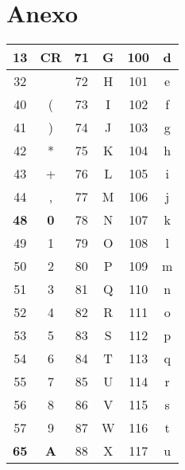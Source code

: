 \documentclass[10pt,twocolumn]{article}
\begin{document}
\section{Anexo}
\label{sec:anexo}

\begin{table}[h!]
  \centering
  \begin{tabular}{|cc|cc|cc|}
  \hline
  13          & CR         & 71         & G            & 100 & d               \\ \hline  
  32          &            & 72         & H            & 101 & e               \\ \hline
  40          & (          & 73         & I            & 102 & f               \\ \hline
  41          & )          & 74         & J            & 103 & g               \\ \hline
  42          & *          & 75         & K            & 104 & h               \\ \hline
  43          & +          & 76         & L            & 105 & i               \\ \hline
  44          & ,          & 77         & M            & 106 & j               \\ \hline
  \textbf{48} & \textbf{0} & 78         & N            & 107 & k               \\ \hline
  49          & 1          & 79         & O            & 108 & l               \\ \hline
  50          & 2          & 80         & P            & 109 & m               \\ \hline
  51          & 3          & 81         & Q            & 110 & n               \\ \hline
  52          & 4          & 82         & R            & 111 & o               \\ \hline
  53          & 5          & 83         & S            & 112 & p               \\ \hline
  54          & 6          & 84         & T            & 113 & q               \\ \hline
  55          & 7          & 85         & U            & 114 & r               \\ \hline
  56          & 8          & 86         & V            & 115 & s               \\ \hline
  57          & 9          & 87         & W            & 116 & t               \\ \hline
  \textbf{65} & \textbf{A} & 88         & X            & 117 & u               \\ \hline

\end{tabular}
\end{table}
\end{document}
